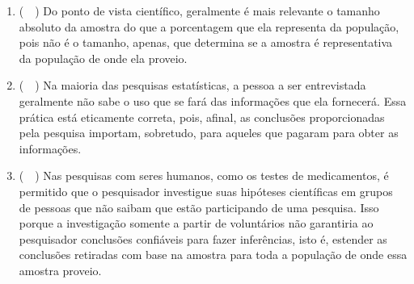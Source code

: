 \begin{enumerate}[label=\emph{\arabic*})]
\begin{enumerate}[label=\emph{\alph*})]
		      \item (~~) Do ponto de vista científico, geralmente é mais relevante o tamanho absoluto da amostra
		            do que a porcentagem que ela representa da população, pois não é o tamanho, apenas,
		            que determina se a amostra é representativa da população de onde ela proveio.

		      \item (~~) Na maioria das pesquisas estatísticas, a pessoa a ser entrevistada geralmente não
		            sabe o uso que se fará das informações que ela fornecerá. Essa prática está
		            eticamente correta, pois, afinal, as conclusões proporcionadas pela pesquisa
		            importam, sobretudo, para aqueles que pagaram para obter as informações.

		      \item (~~) Nas pesquisas com seres humanos, como os testes de medicamentos, é permitido
		            que o pesquisador investigue suas hipóteses científicas em grupos de pessoas que
		            não saibam que estão participando de uma pesquisa. Isso porque a investigação
		            somente a partir de voluntários não garantiria ao pesquisador conclusões confiáveis
		            para fazer inferências, isto é, estender as conclusões retiradas com base na amostra
		            para toda a população de onde essa amostra proveio.

	      \end{enumerate}

\end{enumerate}



